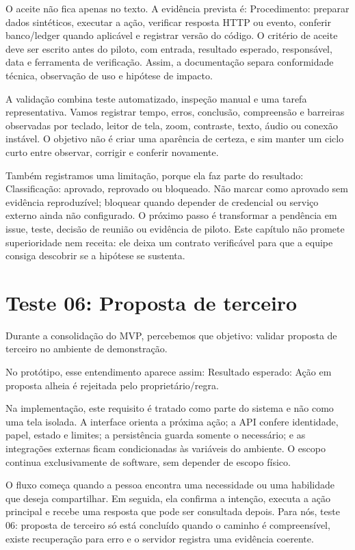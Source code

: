 \documentclass[12pt,oneside,a4paper,article]{abntex2}
\begin{document}
O aceite não fica apenas no texto. A evidência prevista é: Procedimento: preparar dados sintéticos, executar a ação, verificar resposta HTTP ou evento, conferir banco/ledger quando aplicável e registrar versão do código. O critério de aceite deve ser escrito antes do piloto, com entrada, resultado esperado, responsável, data e ferramenta de verificação. Assim, a documentação separa conformidade técnica, observação de uso e hipótese de impacto.

A validação combina teste automatizado, inspeção manual e uma tarefa representativa. Vamos registrar tempo, erros, conclusão, compreensão e barreiras observadas por teclado, leitor de tela, zoom, contraste, texto, áudio ou conexão instável. O objetivo não é criar uma aparência de certeza, e sim manter um ciclo curto entre observar, corrigir e conferir novamente.

Também registramos uma limitação, porque ela faz parte do resultado: Classificação: aprovado, reprovado ou bloqueado. Não marcar como aprovado sem evidência reproduzível; bloquear quando depender de credencial ou serviço externo ainda não configurado. O próximo passo é transformar a pendência em issue, teste, decisão de reunião ou evidência de piloto. Este capítulo não promete superioridade nem receita: ele deixa um contrato verificável para que a equipe consiga descobrir se a hipótese se sustenta.

\section{Teste 06: Proposta de terceiro}
Durante a consolidação do MVP, percebemos que objetivo: validar proposta de terceiro no ambiente de demonstração.

No protótipo, esse entendimento aparece assim: Resultado esperado: Ação em proposta alheia é rejeitada pelo proprietário/regra.

Na implementação, este requisito é tratado como parte do sistema e não como uma tela isolada. A interface orienta a próxima ação; a API confere identidade, papel, estado e limites; a persistência guarda somente o necessário; e as integrações externas ficam condicionadas às variáveis do ambiente. O escopo continua exclusivamente de software, sem depender de escopo físico.

O fluxo começa quando a pessoa encontra uma necessidade ou uma habilidade que deseja compartilhar. Em seguida, ela confirma a intenção, executa a ação principal e recebe uma resposta que pode ser consultada depois. Para nós, teste 06: proposta de terceiro só está concluído quando o caminho é compreensível, existe recuperação para erro e o servidor registra uma evidência coerente.
\end{document}

